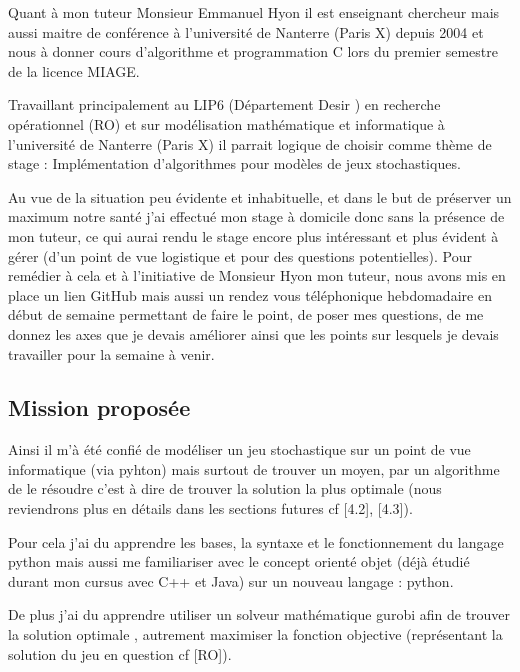 \documentclass[a4paper, 12pt, twoside]{article}
\begin{document}
Quant à mon tuteur Monsieur \textsf{Emmanuel Hyon} il est enseignant chercheur mais aussi   maitre de conférence à l'université de Nanterre (Paris X) depuis 2004 et nous à donner cours d'algorithme et programmation C lors du premier semestre de la licence MIAGE. \newline

Travaillant principalement au LIP6 (Département Desir ) en recherche opérationnel (RO) et sur modélisation mathématique et informatique à l'université de Nanterre (Paris X) il parrait logique de choisir comme thème de stage : \textsf{Implémentation d'algorithmes pour modèles de jeux stochastiques}. \newline

Au vue de la situation peu évidente et inhabituelle, et dans le but de préserver un maximum notre santé j'ai effectué mon stage à domicile donc sans la présence de mon tuteur, ce qui aurai rendu le stage encore plus intéressant et plus évident à gérer (d'un point de vue logistique et pour des questions potentielles). Pour remédier à cela et à l'initiative de Monsieur \textsf{Hyon} mon tuteur, nous avons mis en place un lien \textsf{GitHub} mais aussi un rendez vous téléphonique hebdomadaire en début de semaine permettant de faire le point, de poser mes questions, de me donnez les axes que je devais améliorer ainsi que les points sur lesquels je devais travailler pour la semaine à venir.  

\subsection{Mission proposée}
Ainsi il m'à été confié de modéliser un jeu stochastique sur un point de vue informatique (via \textsf{pyhton}) mais surtout de trouver un moyen, par un algorithme de le résoudre c'est à dire de trouver la solution la plus optimale (nous reviendrons plus en détails dans les sections futures cf [4.2], [4.3]). \newline

Pour cela j'ai du apprendre les bases, la syntaxe et le fonctionnement du langage \textsf{python} mais aussi me familiariser avec le concept orienté objet (déjà étudié durant mon cursus avec \textsf{C++} et \textsf{Java}) sur un nouveau langage : \textsf{python}. \newline

De plus j'ai du apprendre utiliser un solveur mathématique \textsf{gurobi} afin de trouver la solution optimale , autrement maximiser la fonction objective (représentant la solution du jeu en question cf [RO]). \newline
\end{document}
